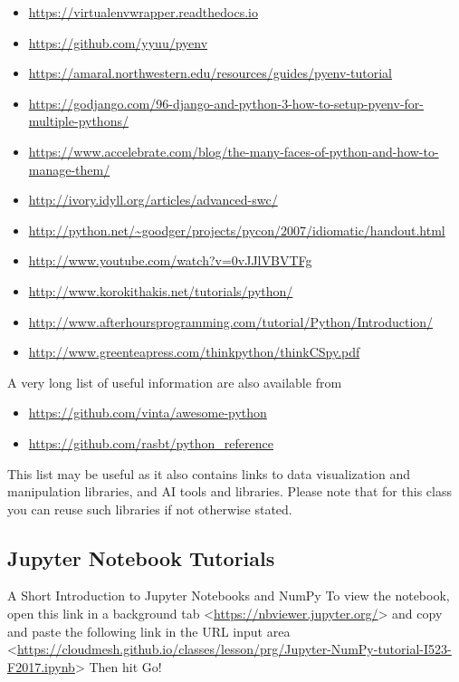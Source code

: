 \begin{itemize}
\tightlist
\item
  \url{https://virtualenvwrapper.readthedocs.io}
\item
  \url{https://github.com/yyuu/pyenv}
\item
  \url{https://amaral.northwestern.edu/resources/guides/pyenv-tutorial}
\item
  \url{https://godjango.com/96-django-and-python-3-how-to-setup-pyenv-for-multiple-pythons/}
\item
  \url{https://www.accelebrate.com/blog/the-many-faces-of-python-and-how-to-manage-them/}
\item
  \url{http://ivory.idyll.org/articles/advanced-swc/}
\item
  \url{http://python.net/~goodger/projects/pycon/2007/idiomatic/handout.html}
\item
  \url{http://www.youtube.com/watch?v=0vJJlVBVTFg}
\item
  \url{http://www.korokithakis.net/tutorials/python/}
\item
  \url{http://www.afterhoursprogramming.com/tutorial/Python/Introduction/}
\item
  \url{http://www.greenteapress.com/thinkpython/thinkCSpy.pdf}
\end{itemize}

A very long list of useful information are also available from

\begin{itemize}
\tightlist
\item
  \url{https://github.com/vinta/awesome-python}
\item
  \url{https://github.com/rasbt/python_reference}
\end{itemize}

This list may be useful as it also contains links to data visualization
and manipulation libraries, and AI tools and libraries. Please note that
for this class you can reuse such libraries if not otherwise stated.

\subsection{Jupyter Notebook
Tutorials}\label{jupyter-notebook-tutorials}

A Short Introduction to Jupyter Notebooks and NumPy To view the
notebook, open this link in a background tab
\textless{}\url{https://nbviewer.jupyter.org/}\textgreater{} and copy
and paste the following link in the URL input area
\textless{}\url{https://cloudmesh.github.io/classes/lesson/prg/Jupyter-NumPy-tutorial-I523-F2017.ipynb}\textgreater{}
Then hit Go!

